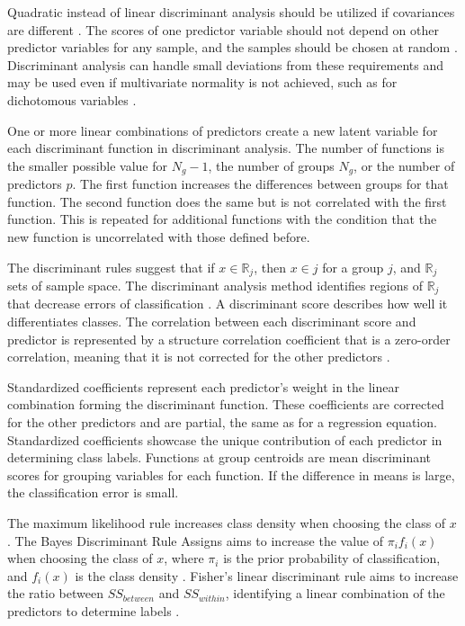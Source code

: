 \documentclass[preprint,12pt]{elsarticle}
\begin{document}
Quadratic instead of linear discriminant analysis should be utilized if covariances are different \cite{cokluk2008discriminant}. The scores of one predictor variable should not depend on other predictor variables for any sample, and the samples should be chosen at random \cite{cokluk2008discriminant, hansen2005using}. Discriminant analysis can handle small deviations from these requirements \cite{lachenbruch1979discriminant} and may be used even if multivariate normality is not achieved, such as for dichotomous variables \cite{klecka1980discriminant}.

One or more linear combinations of predictors create a new latent variable for each discriminant function in discriminant analysis. The number of functions is the smaller possible value for $N_{g}-1$, the number of groups $N_{g}$, or the number of predictors $p$. The first function increases the differences between groups for that function. The second function does the same but is not correlated with the first function. This is repeated for additional functions with the condition that the new function is uncorrelated with those defined before.

The discriminant rules suggest that if $x\in \mathbb{R}_{j}$, then $x\in j$ for a group $j$, and $\mathbb{R}_{j}$ sets of sample space. The discriminant analysis method identifies regions of $\mathbb{R}_{j}$ that decrease errors of classification \cite{Hrdle2003AppliedMS}.
A discriminant score describes how well it differentiates classes.
The correlation between each discriminant score and predictor is represented by a structure correlation coefficient that is a zero-order correlation, meaning that it is not corrected for the other predictors \cite{archive765Discriminant}.


Standardized coefficients represent each predictor's weight in the linear combination forming the discriminant function. These coefficients are corrected for the other predictors and are partial, the same as for a regression equation. Standardized coefficients showcase the unique contribution of each predictor in determining class labels. Functions at group centroids are mean discriminant scores for grouping variables for each function. If the difference in means is large, the classification error is small.

The maximum likelihood rule increases class density when choosing the class of $x$ \cite{Hrdle2003AppliedMS}.
The Bayes Discriminant Rule Assigns aims to increase the value of $\pi_{i}f_{i}(x)$ when choosing the class of $x$, where $\pi_{i}$ is the prior probability of classification, and $f_{i}(x)$ is the class density \cite{Hrdle2003AppliedMS}. Fisher's linear discriminant rule aims to increase the ratio between $SS_{between}$ and $SS_{within}$, identifying a linear combination of the predictors to determine labels \cite{Hrdle2003AppliedMS}.
\end{document}
